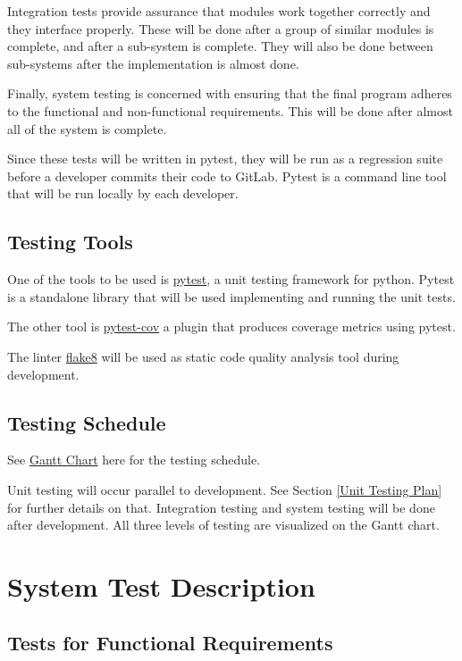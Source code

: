 \documentclass[12pt, titlepage]{article}
\begin{document}
Integration tests provide assurance that modules work together correctly and they interface properly. These will be done after a group of similar modules is complete, and after a sub-system is complete. They will also be done between sub-systems after the implementation is almost done.

Finally, system testing is concerned with ensuring that the final program adheres to the functional and non-functional requirements. This will be done after almost all of the system is complete.

Since these tests will be written in pytest, they will be run as a regression suite before a developer commits their code to GitLab. Pytest is a command line tool that will be run locally by each developer.

\subsection{Testing Tools}

One of the tools to be used is \href{https://docs.pytest.org/en/latest/}{pytest}, a unit testing framework for python. Pytest is a standalone library that will be used implementing and running the unit tests.

The other tool is \href{https://pypi.org/project/pytest-cov/}{pytest-cov} a plugin that produces coverage metrics using pytest.

The linter \href{https://flake8.pycqa.org/en/latest/}{flake8} will be used as static code quality analysis tool during development.

\subsection{Testing Schedule}
		
See \href{https://gitlab.cas.mcmaster.ca/guinnesj/google-images-downloader/-/blob/master/ProjectSchedule/Gantt-Chart.pdf}{Gantt Chart} here for the testing schedule.

Unit testing will occur parallel to development. See Section \ref{Unit Testing Plan} for further details on that. Integration testing and system testing will be done after development. All three levels of testing are visualized on the Gantt chart.

\section{System Test Description}
	
\subsection{Tests for Functional Requirements}
\end{document}
